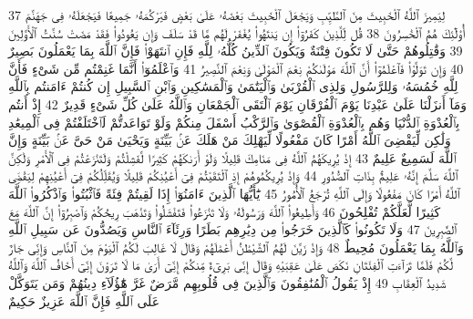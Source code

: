 {\tiny\colorbox{cl_aya}{37}} لِيَمِيزَ ٱللَّهُ ٱلْخَبِيثَ مِنَ ٱلطَّيِّبِ وَيَجْعَلَ ٱلْخَبِيثَ بَعْضَهُۥ عَلَىٰ بَعْضٍ فَيَرْكُمَهُۥ جَمِيعًا فَيَجْعَلَهُۥ فِى جَهَنَّمَ أُو۟لَٰٓئِكَ هُمُ ٱلْخَٰسِرُونَ
{\tiny\colorbox{cl_aya}{38}} قُل لِّلَّذِينَ كَفَرُوٓا۟ إِن يَنتَهُوا۟ يُغْفَرْ لَهُم مَّا قَدْ سَلَفَ وَإِن يَعُودُوا۟ فَقَدْ مَضَتْ سُنَّتُ ٱلْأَوَّلِينَ
{\tiny\colorbox{cl_aya}{39}} وَقَٰتِلُوهُمْ حَتَّىٰ لَا تَكُونَ فِتْنَةٌ وَيَكُونَ ٱلدِّينُ كُلُّهُۥ لِلَّهِ فَإِنِ ٱنتَهَوْا۟ فَإِنَّ ٱللَّهَ بِمَا يَعْمَلُونَ بَصِيرٌ
{\tiny\colorbox{cl_aya}{40}} وَإِن تَوَلَّوْا۟ فَٱعْلَمُوٓا۟ أَنَّ ٱللَّهَ مَوْلَىٰكُمْ نِعْمَ ٱلْمَوْلَىٰ وَنِعْمَ ٱلنَّصِيرُ
{\tiny\colorbox{cl_aya}{41}} وَٱعْلَمُوٓا۟ أَنَّمَا غَنِمْتُم مِّن شَىْءٍ فَأَنَّ لِلَّهِ خُمُسَهُۥ وَلِلرَّسُولِ وَلِذِى ٱلْقُرْبَىٰ وَٱلْيَتَٰمَىٰ وَٱلْمَسَٰكِينِ وَٱبْنِ ٱلسَّبِيلِ إِن كُنتُمْ ءَامَنتُم بِٱللَّهِ وَمَآ أَنزَلْنَا عَلَىٰ عَبْدِنَا يَوْمَ ٱلْفُرْقَانِ يَوْمَ ٱلْتَقَى ٱلْجَمْعَانِ وَٱللَّهُ عَلَىٰ كُلِّ شَىْءٍ قَدِيرٌ
{\tiny\colorbox{cl_aya}{42}} إِذْ أَنتُم بِٱلْعُدْوَةِ ٱلدُّنْيَا وَهُم بِٱلْعُدْوَةِ ٱلْقُصْوَىٰ وَٱلرَّكْبُ أَسْفَلَ مِنكُمْ وَلَوْ تَوَاعَدتُّمْ لَٱخْتَلَفْتُمْ فِى ٱلْمِيعَٰدِ وَلَٰكِن لِّيَقْضِىَ ٱللَّهُ أَمْرًا كَانَ مَفْعُولًا لِّيَهْلِكَ مَنْ هَلَكَ عَنۢ بَيِّنَةٍ وَيَحْيَىٰ مَنْ حَىَّ عَنۢ بَيِّنَةٍ وَإِنَّ ٱللَّهَ لَسَمِيعٌ عَلِيمٌ
{\tiny\colorbox{cl_aya}{43}} إِذْ يُرِيكَهُمُ ٱللَّهُ فِى مَنَامِكَ قَلِيلًا وَلَوْ أَرَىٰكَهُمْ كَثِيرًا لَّفَشِلْتُمْ وَلَتَنَٰزَعْتُمْ فِى ٱلْأَمْرِ وَلَٰكِنَّ ٱللَّهَ سَلَّمَ إِنَّهُۥ عَلِيمٌۢ بِذَاتِ ٱلصُّدُورِ
{\tiny\colorbox{cl_aya}{44}} وَإِذْ يُرِيكُمُوهُمْ إِذِ ٱلْتَقَيْتُمْ فِىٓ أَعْيُنِكُمْ قَلِيلًا وَيُقَلِّلُكُمْ فِىٓ أَعْيُنِهِمْ لِيَقْضِىَ ٱللَّهُ أَمْرًا كَانَ مَفْعُولًا وَإِلَى ٱللَّهِ تُرْجَعُ ٱلْأُمُورُ
{\tiny\colorbox{cl_aya}{45}} يَٰٓأَيُّهَا ٱلَّذِينَ ءَامَنُوٓا۟ إِذَا لَقِيتُمْ فِئَةً فَٱثْبُتُوا۟ وَٱذْكُرُوا۟ ٱللَّهَ كَثِيرًا لَّعَلَّكُمْ تُفْلِحُونَ
{\tiny\colorbox{cl_aya}{46}} وَأَطِيعُوا۟ ٱللَّهَ وَرَسُولَهُۥ وَلَا تَنَٰزَعُوا۟ فَتَفْشَلُوا۟ وَتَذْهَبَ رِيحُكُمْ وَٱصْبِرُوٓا۟ إِنَّ ٱللَّهَ مَعَ ٱلصَّٰبِرِينَ
{\tiny\colorbox{cl_aya}{47}} وَلَا تَكُونُوا۟ كَٱلَّذِينَ خَرَجُوا۟ مِن دِيَٰرِهِم بَطَرًا وَرِئَآءَ ٱلنَّاسِ وَيَصُدُّونَ عَن سَبِيلِ ٱللَّهِ وَٱللَّهُ بِمَا يَعْمَلُونَ مُحِيطٌ
{\tiny\colorbox{cl_aya}{48}} وَإِذْ زَيَّنَ لَهُمُ ٱلشَّيْطَٰنُ أَعْمَٰلَهُمْ وَقَالَ لَا غَالِبَ لَكُمُ ٱلْيَوْمَ مِنَ ٱلنَّاسِ وَإِنِّى جَارٌ لَّكُمْ فَلَمَّا تَرَآءَتِ ٱلْفِئَتَانِ نَكَصَ عَلَىٰ عَقِبَيْهِ وَقَالَ إِنِّى بَرِىٓءٌ مِّنكُمْ إِنِّىٓ أَرَىٰ مَا لَا تَرَوْنَ إِنِّىٓ أَخَافُ ٱللَّهَ وَٱللَّهُ شَدِيدُ ٱلْعِقَابِ
{\tiny\colorbox{cl_aya}{49}} إِذْ يَقُولُ ٱلْمُنَٰفِقُونَ وَٱلَّذِينَ فِى قُلُوبِهِم مَّرَضٌ غَرَّ هَٰٓؤُلَآءِ دِينُهُمْ وَمَن يَتَوَكَّلْ عَلَى ٱللَّهِ فَإِنَّ ٱللَّهَ عَزِيزٌ حَكِيمٌ
